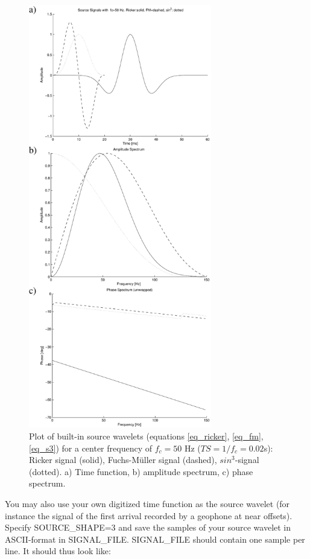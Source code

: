\documentclass[11pt,onecolumn,oneside]{article}
\begin{document}
\begin{figure}
\begin{center}
\includegraphics[width=8cm,angle=0]{eps/signals.pdf}
\end{center}
\caption{Plot of built-in source wavelets (equations \ref{eq_ricker}, \ref{eq_fm}, \ref{eq_s3}) for a center frequency of $f_c=50$ Hz 
($TS=1/f_c=0.02$s): Ricker signal (solid), Fuchs-M\"uller signal (dashed), $sin^3$-signal (dotted). a) Time function, b) amplitude
spectrum, c) phase spectrum.  }
\label{fig_source_wavelets}
\end{figure}

You may also use your own digitized time function as the source wavelet (for instance the signal of the first arrival recorded by a geophone at near offsets). Specify SOURCE\_SHAPE=3 and save the samples of
your source wavelet in ASCII-format in SIGNAL\_FILE. SIGNAL\_FILE should contain one sample per line. It should thus look like:
\end{document}
